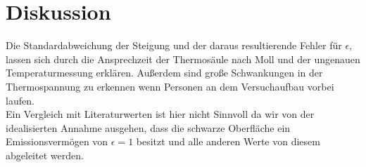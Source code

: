 \section{Diskussion}
\label{sec:Diskussion}
Die Standardabweichung der Steigung und der daraus resultierende Fehler für $\epsilon$, lassen sich durch die Ansprechzeit der Thermosäule nach Moll und der ungenauen Temperaturmessung erklären. Außerdem sind große Schwankungen in der Thermospannung zu erkennen wenn Personen an dem Versuchaufbau vorbei laufen.
\\
Ein Vergleich mit Literaturwerten ist hier nicht Sinnvoll da wir von der idealisierten Annahme ausgehen, dass die schwarze Oberfläche ein Emissionsvermögen von $\epsilon = 1$ besitzt und alle anderen Werte von diesem abgeleitet werden.
\\
